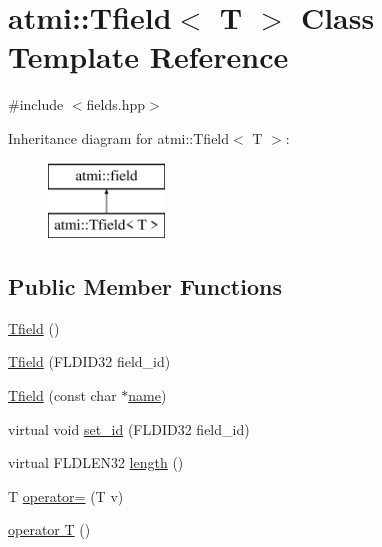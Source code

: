 \hypertarget{classatmi_1_1_tfield}{\section{atmi\+:\+:Tfield$<$ T $>$ Class Template Reference}
\label{classatmi_1_1_tfield}
}


 




{\ttfamily \#include $<$fields.\+hpp$>$}

Inheritance diagram for atmi\+:\+:Tfield$<$ T $>$\+:\begin{figure}[H]
\begin{center}
\leavevmode
\includegraphics[height=2.000000cm]{classatmi_1_1_tfield}
\end{center}
\end{figure}
\subsection*{Public Member Functions}
\begin{DoxyCompactItemize}
\item 
\hyperlink{classatmi_1_1_tfield_a533be0f49416e622563e7f437e7e9014}{Tfield} ()
\item 
\hyperlink{classatmi_1_1_tfield_a10739dd7cef7fad99e5c32213bc69fca}{Tfield} (F\+L\+D\+I\+D32 field\+\_\+id)
\item 
\hyperlink{classatmi_1_1_tfield_a9718a2fcffa95fda6e31f18815d05dbe}{Tfield} (const char $\ast$\hyperlink{classatmi_1_1field_a0fbc5a958a0af8286e339b088ee69bc8}{name})
\item 
virtual void \hyperlink{classatmi_1_1_tfield_ac458fcdcce36a34d8beed526ca1e385a}{set\+\_\+id} (F\+L\+D\+I\+D32 field\+\_\+id)
\item 
virtual F\+L\+D\+L\+E\+N32 \hyperlink{classatmi_1_1_tfield_a6138c508841c4a837ea8c8e089755278}{length} ()
\item 
T \hyperlink{classatmi_1_1_tfield_a7903e881d35805b1477b1ef8f2928f4e}{operator=} (T v)
\item 
\hyperlink{classatmi_1_1_tfield_ad8b13cf9dc43ad4a896ab96a1aefb31f}{operator T} ()
\end{DoxyCompactItemize}
